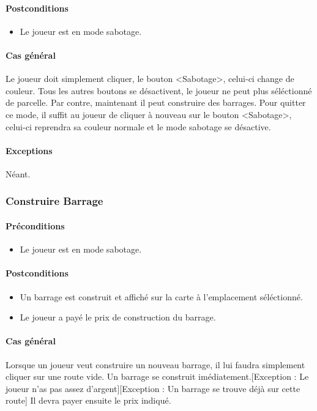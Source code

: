 \documentclass[a4paper,11pt]{report}
\begin{document}
\paragraph{Postconditions}
\begin{itemize}
	\item Le joueur est en mode sabotage.
\end{itemize}
\paragraph{Cas général}
Le joueur doit simplement cliquer, le bouton <Sabotage>, celui-ci change de couleur. Tous les autres boutons se désactivent, le joueur ne peut plus séléctionné de parcelle. Par contre, maintenant il peut construire des barrages.
Pour quitter ce mode, il suffit au joueur de cliquer à nouveau sur le bouton <Sabotage>, celui-ci reprendra sa couleur normale et le mode sabotage se désactive.
\paragraph{Exceptions} Néant.

\subsubsection{Construire Barrage}
\paragraph{Préconditions}
\begin{itemize}
	\item Le joueur est en mode sabotage.
\end{itemize}
\paragraph{Postconditions}
\begin{itemize}
	\item Un barrage est construit et affiché sur la carte à l'emplacement séléctionné.
	\item Le joueur a payé le prix de construction du barrage.
\end{itemize}
\paragraph{Cas général}
Lorsque un joueur veut construire un nouveau barrage, il lui faudra simplement cliquer sur une route vide. Un barrage se construit imédiatement.[Exception : Le joueur n'as pas assez d'argent][Exception : Un barrage se trouve déjà sur cette route] Il devra payer ensuite le prix indiqué.
\end{document}
